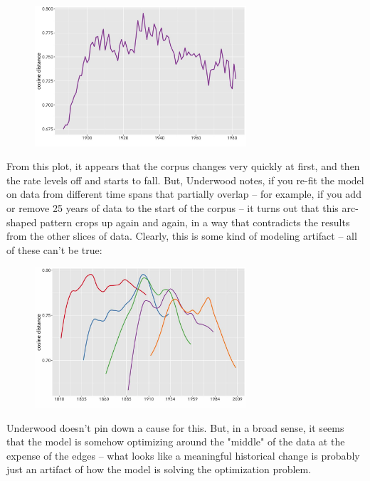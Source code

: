 \documentclass{scrartcl}
\begin{document}
\begin{figure}[H]
  \centering
  \includegraphics[width=0.7\textwidth]{figures/tm-banding-1.jpg}
\end{figure}

From this plot, it appears that the corpus changes very quickly at first, and then the rate levels off and starts to fall. But, Underwood notes, if you re-fit the model on data from different time spans that partially overlap -- for example, if you add or remove 25 years of data to the start of the corpus -- it turns out that this arc-shaped pattern crops up again and again, in a way that contradicts the results from the other slices of data. Clearly, this is some kind of modeling artifact -- all of these can't be true:

\begin{figure}[H]
  \centering
  \includegraphics[width=0.7\textwidth]{figures/tm-banding-2.jpg}
\end{figure}

Underwood doesn't pin down a cause for this. But, in a broad sense, it seems that the model is somehow optimizing around the "middle" of the data at the expense of the edges -- what looks like a meaningful historical change is probably just an artifact of how the model is solving the optimization problem.
\end{document}
